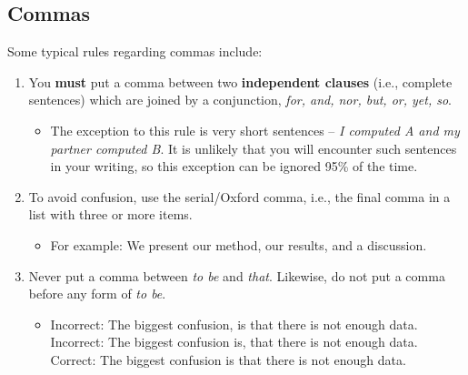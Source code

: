 \subsection{Commas}
Some typical rules regarding commas include:
\begin{enumerate}
	\item You \textbf{must} put a comma between two \textbf{independent clauses} (i.e., complete sentences) which are joined by a conjunction, \textit{for, and, nor, but, or, yet, so}.
	      \begin{itemize}
		      \item The exception to this rule is very short sentences -- \textit{I computed A and my partner computed B}.
		            It is unlikely that you will encounter such sentences in your writing, so this exception can be ignored 95\% of the time.
	      \end{itemize}
	\item To avoid confusion, use the serial/Oxford comma, i.e., the final comma in a list with three or more items.
	      \begin{itemize}
		      \item For example: We present our method, our results, and a discussion.
	      \end{itemize}
	\item Never put a comma between \textit{to be} and \textit{that}.
	      Likewise, do not put a comma before any form of \textit{to be}.
	      \begin{itemize}
		      \item Incorrect: The biggest confusion, is that there is not enough data. \\
		            Incorrect: The biggest confusion is, that there is not enough data.\\
		            Correct: The biggest confusion is that there is not enough data.
	      \end{itemize}

\end{enumerate}
